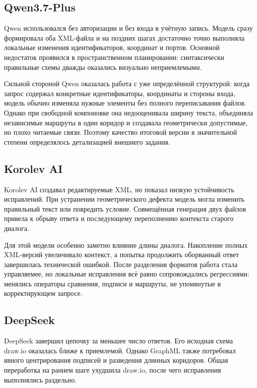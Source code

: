 \documentclass[a4paper,12pt]{extreport}
\begin{document}
\subsection{Qwen3.7-Plus}

Qwen использовался без авторизации и без входа в учётную запись. Модель сразу формировала оба XML-файла и на поздних шагах достаточно точно выполняла локальные изменения идентификаторов, координат и портов. Основной недостаток проявился в пространственном планировании: синтаксически правильные схемы дважды оказались визуально неприемлемыми.

Сильной стороной Qwen оказалась работа с уже определённой структурой: когда запрос содержал конкретные идентификаторы, координаты и стороны входа, модель обычно изменяла нужные элементы без полного переписывания файлов. Однако при свободной компоновке она недооценивала ширину текста, объединяла независимые маршруты в один коридор и создавала геометрически допустимые, но плохо читаемые связи. Поэтому качество итоговой версии в значительной степени определялось детализацией внешнего задания.

\subsection{Korolev AI}

Korolev AI создавал редактируемые XML, но показал низкую устойчивость исправлений. При устранении геометрического дефекта модель могла изменить правильный текст или повредить условие. Совмещённая генерация двух файлов привела к обрыву ответа и последующему переполнению контекста старого диалога.

Для этой модели особенно заметно влияние длины диалога. Накопление полных XML-версий увеличивало контекст, а попытка продолжить оборванный ответ завершилась технической ошибкой. После разделения форматов работа стала управляемее, но локальные исправления всё равно сопровождались регрессиями: менялись операторы сравнения, подписи и маршруты, не упомянутые в корректирующем запросе.

\subsection{DeepSeek}

DeepSeek завершил цепочку за меньшее число ответов. Его исходная схема draw.io оказалась ближе к приемлемой. Однако GraphML также потребовал явного центрирования подписей и разведения длинных коридоров. Общая переработка на раннем шаге ухудшила draw.io, после чего исправления выполнялись раздельно.
\end{document}
